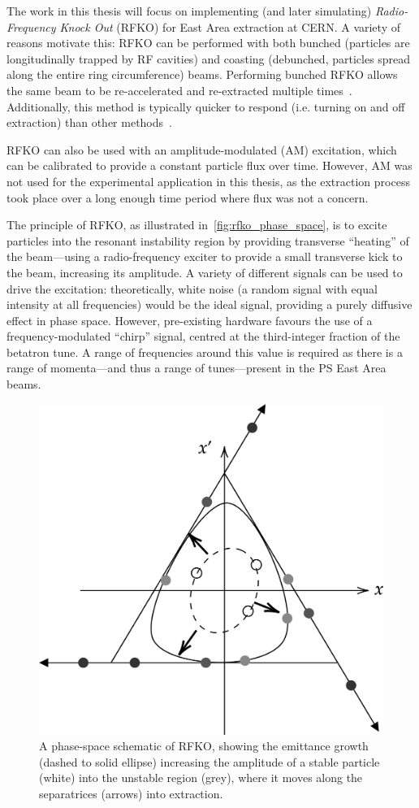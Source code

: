 \documentclass[a4paper,twoside,11pt]{report}
\begin{document}
The work in this thesis will focus on implementing (and later simulating) \textit{Radio-Frequency Knock Out} (RFKO) for East Area extraction at CERN. A variety of reasons motivate this: RFKO can be performed with both bunched (particles are longitudinally trapped by RF cavities) and coasting (debunched, particles spread along the entire ring circumference) beams. Performing bunched RFKO allows the same beam to be re-accelerated and re-extracted multiple times~\cite{russo}. Additionally, this method is typically quicker to respond (i.e. turning on and off extraction) than other methods~\cite{Furukawa2002PROGRESSOR, FURUKAWA200259, NODA2002241}.

RFKO can also be used with an amplitude-modulated (AM) excitation, which can be calibrated to provide a constant particle flux over time. However, AM was not used for the experimental application in this thesis, as the extraction process took place over a long enough time period where flux was not a concern.

The principle of RFKO, as illustrated in~\autoref{fig:rfko_phase_space}, is to excite particles into the resonant instability region by providing transverse ``heating'' of the beam---using a radio-frequency exciter to provide a small transverse kick to the beam, increasing its amplitude. A variety of different signals can be used to drive the excitation: theoretically, white noise (a random signal with equal intensity at all frequencies) would be the ideal signal, providing a purely diffusive effect in phase space. However, pre-existing hardware favours the use of a frequency-modulated ``chirp'' signal, centred at the third-integer fraction of the betatron tune. A range of frequencies around this value is required as there is a range of momenta---and thus a range of tunes---present in the PS East Area beams. 

\begin{figure}
  \centering
  \includegraphics*[width=0.6\linewidth]{rfko-phase-space-schematic.png}
  \caption[Phase-space schematic of RFKO slow extraction]{A phase-space schematic of RFKO, showing the emittance growth (dashed to solid ellipse) increasing the amplitude of a stable particle (white) into the unstable region (grey), where it moves along the separatrices (arrows) into extraction.}\label{fig:rfko_phase_space}
\end{figure}
\end{document}
